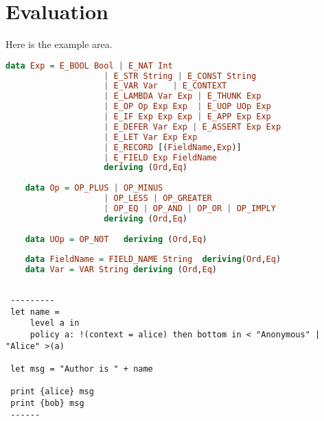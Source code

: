 \section{Evaluation}
\label{evaluation}
Here is the example area.

\begin{lstlisting}[language=Haskell]
    data Exp = E_BOOL Bool | E_NAT Int 
                    | E_STR String | E_CONST String  
                    | E_VAR Var   | E_CONTEXT 
                    | E_LAMBDA Var Exp | E_THUNK Exp 
                    | E_OP Op Exp Exp  | E_UOP UOp Exp                    
                    | E_IF Exp Exp Exp | E_APP Exp Exp                   
                    | E_DEFER Var Exp | E_ASSERT Exp Exp                  
                    | E_LET Var Exp Exp                   
                    | E_RECORD [(FieldName,Exp)] 
                    | E_FIELD Exp FieldName
                    deriving (Ord,Eq)
    
    data Op = OP_PLUS | OP_MINUS
                    | OP_LESS | OP_GREATER 
                    | OP_EQ | OP_AND | OP_OR | OP_IMPLY
                    deriving (Ord,Eq)
    
    data UOp = OP_NOT   deriving (Ord,Eq) 
    
    data FieldName = FIELD_NAME String  deriving(Ord,Eq)
    data Var = VAR String deriving (Ord,Eq)
    
\end{lstlisting}

\begin{verbatim}
 ---------
 let name =  
     level a in
     policy a: !(context = alice) then bottom in < "Anonymous" | "Alice" >(a)
 
 let msg = "Author is " + name
 
 print {alice} msg
 print {bob} msg
 ------
\end{verbatim}


